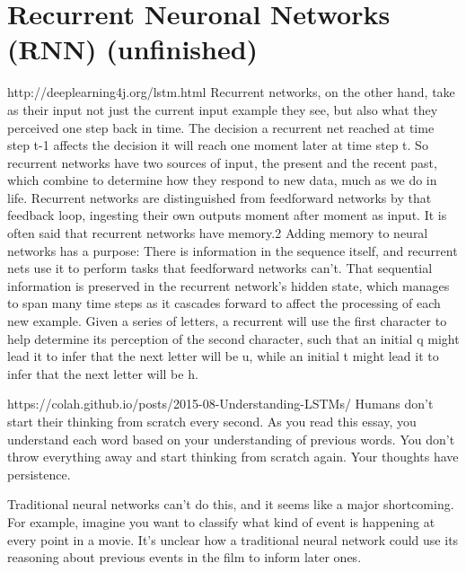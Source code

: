 {\section{Recurrent Neuronal Networks (RNN) (unfinished)}
http://deeplearning4j.org/lstm.html
Recurrent networks, on the other hand, take as their input not just the current input example they see, but also what they perceived one step back in time.
The decision a recurrent net reached at time step t-1 affects the decision it will reach one moment later at time step t. So recurrent networks have two sources of input, the present and the recent past, which combine to determine how they respond to new data, much as we do in life.
Recurrent networks are distinguished from feedforward networks by that feedback loop, ingesting their own outputs moment after moment as input. It is often said that recurrent networks have memory.2 Adding memory to neural networks has a purpose: There is information in the sequence itself, and recurrent nets use it to perform tasks that feedforward networks can’t.
That sequential information is preserved in the recurrent network’s hidden state, which manages to span many time steps as it cascades forward to affect the processing of each new example.
Given a series of letters, a recurrent will use the first character to help determine its perception of the second character, such that an initial q might lead it to infer that the next letter will be u, while an initial t might lead it to infer that the next letter will be h.


https://colah.github.io/posts/2015-08-Understanding-LSTMs/
Humans don’t start their thinking from scratch every second. As you read this essay, you understand each word based on your understanding of previous words. You don’t throw everything away and start thinking from scratch again. Your thoughts have persistence.

Traditional neural networks can’t do this, and it seems like a major shortcoming. For example, imagine you want to classify what kind of event is happening at every point in a movie. It’s unclear how a traditional neural network could use its reasoning about previous events in the film to inform later ones.

}
